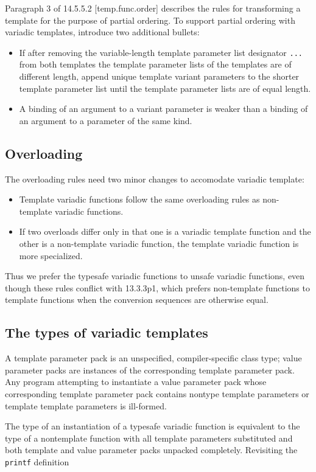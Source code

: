 \documentclass{article}
\begin{document}
Paragraph 3 of 14.5.5.2 [temp.func.order] describes the rules for
transforming a template for the purpose of partial ordering. To
support partial ordering with variadic templates, introduce two
additional bullets:
\begin{itemize}
\item If after removing the variable-length template parameter list
  designator \verb|...| from both templates the template parameter lists of the
  templates are of different length, append unique template variant
  parameters to the shorter template parameter list until the template
  parameter lists are of equal length.
\item A binding of an argument to a variant parameter is weaker than a
  binding of an argument to a parameter of the same kind.
\end{itemize}

\subsection{Overloading}
\label{overloading}
The overloading rules need two minor changes to accomodate variadic template:
\begin{itemize}
\item Template variadic functions follow the same overloading rules as
  non-template variadic functions.
\item If two overloads differ only in that one is a variadic template
  function and the other is a non-template variadic function, the
  template variadic function is more specialized.
\end{itemize}

Thus we prefer the typesafe variadic functions to unsafe variadic
functions, even though these rules conflict with 13.3.3p1, which
prefers non-template functions to template functions when the
conversion sequences are otherwise equal.

\subsection{The types of variadic templates}
A template parameter pack is an unspecified, compiler-specific class
type; value parameter packs are instances of the corresponding
template parameter pack. Any program attempting to instantiate a value
parameter pack whose corresponding template parameter pack contains
nontype template parameters or template template parameters is
ill-formed. 

The type of an instantiation of a typesafe variadic function is
equivalent to the type of a nontemplate function with all template
parameters substituted and both template and value parameter packs
unpacked completely. Revisiting the {\tt printf} definition
\end{document}
